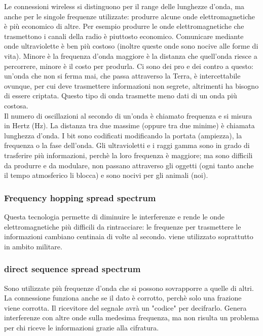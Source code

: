 \documentclass{article}
\begin{document}
Le connessioni wireless si distinguono per il range delle lunghezze d'onda, ma
anche per le singole frequenze utilizzate: produrre alcune onde
elettromagnetiche è più economico di altre. Per esempio produrre le onde
elettromagnetiche che trasmettono i canali della radio è piuttosto economico.
Comunicare mediante onde ultraviolette è ben più costoso (inoltre queste onde
sono nocive alle forme di vita). Minore è la frequenza d'onda maggiore è la
distanza che quell'onda riesce a percorrere, minore è il costo per produrla. Ci
sono dei pro e dei contro a questo: un'onda che non si ferma mai, che passa
attraverso la Terra, è intercettabile ovunque, per cui deve trasmettere
informazioni non segrete, altrimenti ha bisogno di essere criptata. Questo tipo
di onda trasmette meno dati di un onda più costosa.\\

Il numero di oscillazioni al secondo di un'onda è chiamato frequenza e si misura
in Hertz (Hz). La distanza tra due massime (oppure tra due minime) è chiamata
lunghezza d'onda. I bit sono codificati modificando la portata (ampiezza), la
frequenza o la fase dell'onda. Gli ultravioletti e i raggi gamma sono in grado
di trasferire più informazioni, perchè la loro frequenza è maggiore; ma sono
difficili da produrre e da modulare, non passano attraverso gli oggetti (ogni
tanto anche il tempo atmosferico li blocca) e sono nocivi per gli animali (noi).

\subsubsection{Frequency hopping spread spectrum}
Questa tecnologia permette di diminuire le interferenze e rende le onde
elettromagnetiche più difficili da rintracciare: le frequenze per trasmettere le
informazioni cambiano centinaia di volte al secondo. viene utilizzato
soprattutto in ambito militare.

\subsubsection{direct sequence spread spectrum}
Sono utilizzate più frequenze d'onda che si possono sovrapporre a quelle di
altri. La connessione funziona anche se il dato è corrotto, perchè solo una
frazione viene corrotta. Il ricevitore del segnale avrà un "codice" per
decifrarlo. Genera interferenze con altre onde sulla medesima frequenza, ma non
risulta un problema per chi riceve le informazioni grazie alla
cifratura.
\end{document}
